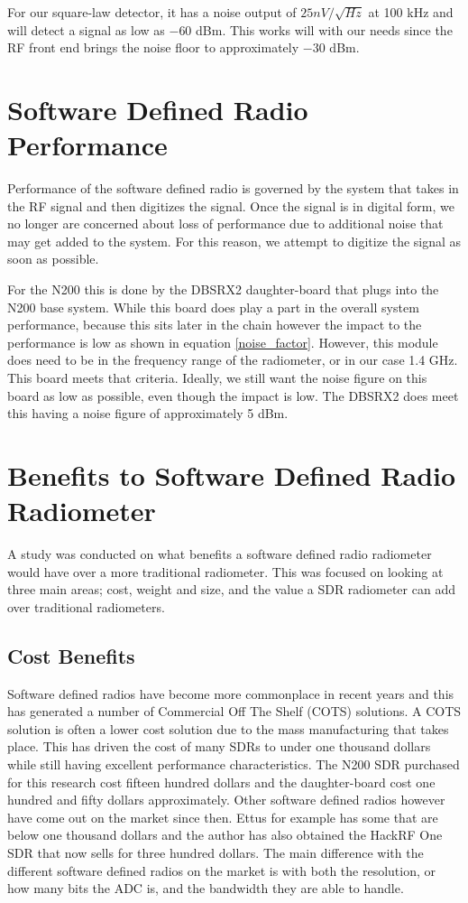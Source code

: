 For our square-law detector, it has a noise output of $25nV/ \sqrt{Hz}$ at 100 kHz and will detect a signal as low as $-60$ dBm.  This works will with our needs since the RF front end brings the noise floor to approximately $-30$ dBm.


\section{Software Defined Radio Performance}
Performance of the software defined radio is governed by the system that takes in the RF signal and then digitizes the signal.  Once the signal is in digital form, we no longer are concerned about loss of performance due to additional noise that may get added to the system.  For this reason, we attempt to digitize the signal as soon as possible.

For the N200 this is done by the DBSRX2 daughter-board that plugs into the N200 base system.  While this board does play a part in the overall system performance, because this sits later in the chain however the impact to the performance is low as shown in equation \ref{noise_factor}.  However, this module does need to be in the frequency range of the radiometer, or in our case 1.4 GHz.  This board meets that criteria.  Ideally, we still want the noise figure on this board as low as possible, even though the impact is low.  The DBSRX2 does meet this having a noise figure of approximately 5 dBm.
\section{Benefits to Software Defined Radio Radiometer}
A study was conducted on what benefits a software defined radio radiometer would have over a more traditional radiometer.  This was focused on looking at three main areas; cost, weight and size, and the value a SDR radiometer can add over traditional radiometers.

\subsection{Cost Benefits}
Software defined radios have become more commonplace in recent years and this has generated a number of Commercial Off The Shelf (COTS) solutions.  A COTS solution is often a lower cost solution due to the mass manufacturing that takes place.  This has driven the cost of many SDRs to under one thousand dollars while still having excellent performance characteristics.  The N200 SDR purchased for this research cost fifteen hundred dollars and the daughter-board cost one hundred and fifty dollars approximately.  Other software defined radios however have come out on the market since then.  Ettus for example has some that are below one thousand dollars and the author has also obtained the HackRF One SDR that now sells for three hundred dollars.  The main difference with the different software defined radios on the market is with both the resolution, or how many bits the ADC is, and the bandwidth they are able to handle.

